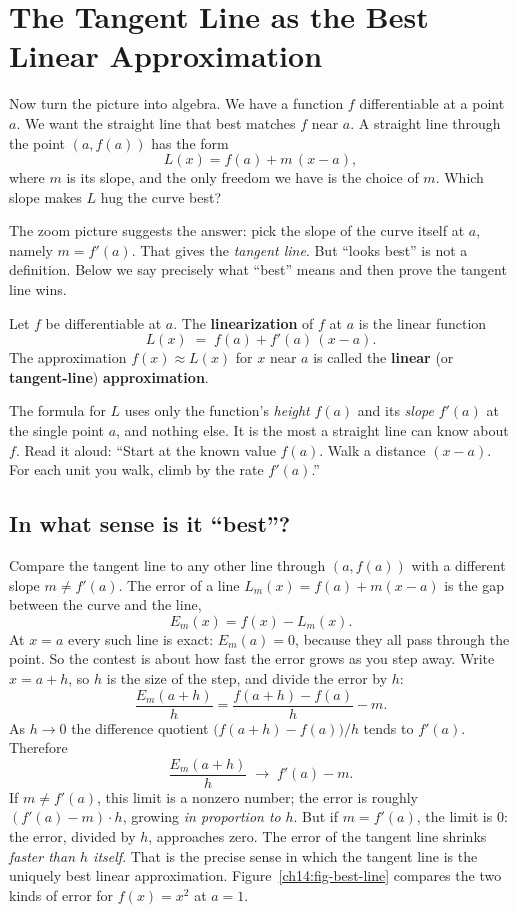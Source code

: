 \section{The Tangent Line as the Best Linear Approximation}
\label{ch14:tangent-best}

Now turn the picture into algebra. We have a function $f$ differentiable at a
point $a$. We want the straight line that best matches $f$ near $a$. A straight
line through the point $(a,f(a))$ has the form
\[
L(x) = f(a) + m\,(x-a),
\]
where $m$ is its slope, and the only freedom we have is the choice of $m$. Which
slope makes $L$ hug the curve best?

The zoom picture suggests the answer: pick the slope of the
curve itself at $a$, namely $m=f'(a)$. That gives the \emph{tangent line}. But
``looks best'' is not a definition. Below we say precisely what ``best'' means and
then prove the tangent line wins.

\begin{definition}[Linearization]
\label{ch14:def-linearization}
Let $f$ be differentiable at $a$. The \textbf{linearization} of $f$ at $a$ is the
linear function
\[
L(x) \;=\; f(a) + f'(a)\,(x-a).
\]
The approximation $f(x)\approx L(x)$ for $x$ near $a$ is called the
\textbf{linear} (or \textbf{tangent-line}) \textbf{approximation}.
\end{definition}

The formula for $L$ uses only the function's \emph{height} $f(a)$ and its
\emph{slope} $f'(a)$ at the single point $a$, and nothing else. It is the most a
straight line can know about $f$. Read it aloud: ``Start at the known value
$f(a)$. Walk a distance $(x-a)$. For each unit you walk, climb by the rate
$f'(a)$.''

\subsection{In what sense is it ``best''?}

Compare the tangent line to any other line through $(a,f(a))$ with a different
slope $m\neq f'(a)$. The error of a line $L_m(x)=f(a)+m(x-a)$ is the gap between
the curve and the line,
\[
E_m(x) = f(x) - L_m(x).
\]
At $x=a$ every such line is exact: $E_m(a)=0$, because they all pass through the
point. So the contest is about how fast the error grows as you step away. Write
$x = a+h$, so $h$ is the size of the step, and divide the error by $h$:
\[
\frac{E_m(a+h)}{h} = \frac{f(a+h)-f(a)}{h} - m.
\]
As $h\to 0$ the difference quotient $\bigl(f(a+h)-f(a)\bigr)/h$ tends to $f'(a)$.
Therefore
\[
\frac{E_m(a+h)}{h} \;\longrightarrow\; f'(a)-m.
\]
If $m\neq f'(a)$, this limit is a nonzero number; the
error is roughly $(f'(a)-m)\cdot h$, growing \emph{in proportion to} $h$. But if
$m=f'(a)$, the limit is $0$: the error, divided by $h$, approaches zero. The error of the
tangent line shrinks \emph{faster than $h$ itself}. That is the precise sense in
which the tangent line is the uniquely best linear approximation.
Figure~\ref{ch14:fig-best-line} compares the two kinds of error for $f(x)=x^2$
at $a=1$.

